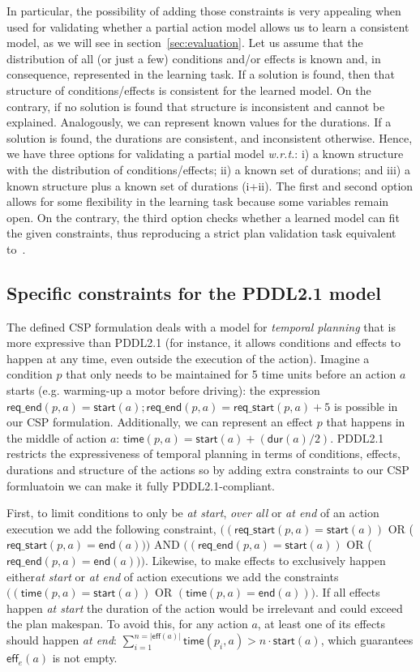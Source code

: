 \documentclass{ecai}
\newcommand{\eff}{\mathsf{eff}}    %
\newcommand{\dur}{\mathsf{dur}}    %
\newcommand{\start}{\mathsf{start}}%
\newcommand{\en}{\mathsf{end}}     %
\newcommand{\tim}{\mathsf{time}}   %
\newcommand{\reqs}{\mathsf{req\_{start}}} %
\newcommand{\reqe}{\mathsf{req\_{end}}}   %
\begin{document}
In particular, the possibility of adding those constraints is very appealing when used for validating whether a partial action model allows us to learn a consistent model, as we will see in section~\ref{sec:evaluation}.
Let us assume that the distribution of all (or just a few) conditions and/or effects is known and, in consequence, represented in the learning task. If a solution is found, then that structure of conditions/effects is consistent for the learned model. On the contrary, if no solution is found that structure is inconsistent and cannot be explained.
Analogously, we can represent known values for the durations. If a solution is found, the durations are consistent, and inconsistent otherwise.
Hence, we have three options for validating a partial model \emph{w.r.t.}: i) a known structure with the distribution of conditions/effects; ii) a known set of durations; and iii) a known structure plus a known set of durations (i+ii).
The first and second option allows for some flexibility in the learning task because some variables remain open. On the contrary, the third option checks whether a learned model can fit the given constraints, thus reproducing a strict plan validation task equivalent to~\cite{howey2004val}.


\subsection{Specific constraints for the PDDL2.1 model}
\label{sec:PDDL21constraints}
The defined CSP formulation deals with a model for {\em temporal planning} that is more expressive than PDDL2.1 (for instance, it allows conditions and effects to happen at any time, even outside the execution of the action). Imagine a condition $p$ that only needs to be maintained for 5 time units before an action $a$ starts (e.g. warming-up a motor before driving): the expression $\reqe(p,a)=\start(a); \reqe(p,a) = \reqs(p,a)+5$ is possible in our CSP formulation. Additionally, we can represent an effect $p$ that happens in the middle of action $a$: $\tim(p,a) = \start(a)+ (\dur(a) / 2)$. PDDL2.1 restricts the expressiveness of temporal planning in terms of conditions, effects, durations and structure of the actions so by adding extra constraints to our CSP formluatoin we can make it fully PDDL2.1-compliant.

First, to limit conditions to only be \emph{at start}, \emph{over all} or \emph{at end} of an action execution we add the following constraint, $((\reqs(p,a) = \start(a))$ OR ($\reqs(p,a) = \en(a)))$ AND $((\reqe(p,a) = \start(a))$ OR ($\reqe(p,a) = \en(a)))$. Likewise, to make effects to exclusively happen either\emph{at start} or \emph{at end} of action executions we add the constraints $((\tim(p,a) = \start(a))$ OR $(\tim(p,a) = \en(a)))$. If all effects happen \emph{at start} the duration of the action would be irrelevant and could exceed the plan makespan. To avoid this, for any action $a$, at least one of its effects should happen \emph{at end}: $\sum_{i=1}^{n =|\eff(a)|} \tim(p_i,a) > n \cdot \start(a)$, which guarantees $\eff_e(a)$ is not empty.
\end{document}
